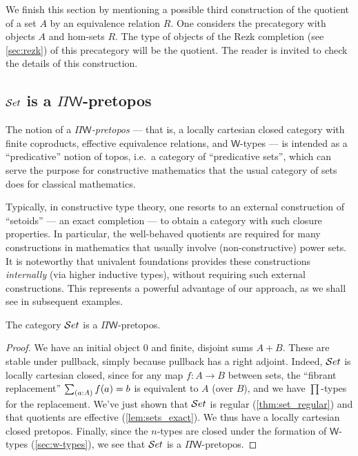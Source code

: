 We finish this section by mentioning a possible third construction of the quotient of a set $A$ by an equivalence relation $R$. One
considers the precategory with objects $A$ and hom-sets $R$. The type of objects of the Rezk completion (see \autoref{sec:rezk}) of this precategory will be the
quotient. The reader is invited to check the details of this construction.

\subsection{\texorpdfstring{$\mathcal{S}et$}{Set} is a \texorpdfstring{$\Pi\mathsf{W}$}{ΠW}-pretopos}
\label{subsec:piw}

The notion of a \emph{$\Pi\mathsf{W}$-pretopos} --- that is, a locally cartesian closed category with finite coproducts, effective equivalence relations, and $\mathsf{W}$-types --- is intended as a ``predicative'' notion of topos, i.e.\ a category of ``predicative sets'', which can serve the purpose for constructive mathematics that the usual category of sets does for classical mathematics.  

Typically, in constructive type theory, one resorts to an external construction of ``setoids'' --- an exact completion --- to obtain a category with such closure properties.  In particular, the well-behaved quotients are required for many constructions in mathematics that usually involve (non-constructive) power sets.  It is noteworthy that univalent foundations provides these constructions \emph{internally} (via higher inductive types), without requiring such external constructions.  This represents a powerful advantage of our approach, as we shall see in subsequent examples.

\begin{thm} The category $\mathcal{S}et$ is a $\Pi\mathsf{W}$-pretopos.
\end{thm}
\begin{proof}
We have an initial object $0$ and finite, disjoint sums $A+B$.  These are stable under pullback, simply because pullback has a right adjoint.  Indeed, $\mathcal{S}et$ is locally cartesian closed, since for any map $f:A\to B$ between sets, the ``fibrant replacement'' $\sm{a:A}f(a)=b$ is equivalent to $A$ (over $B$), and we have $\prod$-types for the replacement.
We've just shown that $\mathcal{S}et$ is regular (\autoref{thm:set_regular}) and that quotients are effective (\autoref{lem:sets_exact}). We thus have a locally cartesian closed pretopos. Finally, since the $n$-types are closed under the formation of $\mathsf{W}$-types
(\autoref{sec:w-types}), we see that $\mathcal{S}et$ is a $\Pi\mathsf{W}$-pretopos. 
\end{proof}

